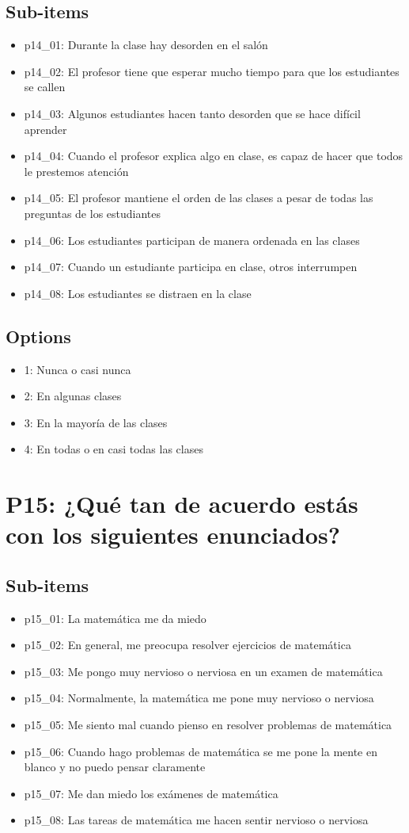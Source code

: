 \documentclass[11pt]{article}
\begin{document}
\subsection*{Sub-items}
\begin{itemize}[leftmargin=*]
  \item p14\_01: Durante la clase hay desorden en el salón
  \item p14\_02: El profesor tiene que esperar mucho tiempo para que los estudiantes se callen
  \item p14\_03: Algunos estudiantes hacen tanto desorden que se hace difícil aprender
  \item p14\_04: Cuando el profesor explica algo en clase, es capaz de hacer que todos le prestemos atención
  \item p14\_05: El profesor mantiene el orden de las clases a pesar de todas las preguntas de los estudiantes
  \item p14\_06: Los estudiantes participan de manera ordenada en las clases
  \item p14\_07: Cuando un estudiante participa en clase, otros interrumpen
  \item p14\_08: Los estudiantes se distraen en la clase
\end{itemize}
\subsection*{Options}
\begin{itemize}[leftmargin=*]
  \item 1: Nunca o casi nunca
  \item 2: En algunas clases
  \item 3: En la mayoría de las clases
  \item 4: En todas o en casi todas las clases
\end{itemize}
\bigskip
\section*{P15: ¿Qué tan de acuerdo estás con los siguientes enunciados?}
\subsection*{Sub-items}
\begin{itemize}[leftmargin=*]
  \item p15\_01: La matemática me da miedo
  \item p15\_02: En general, me preocupa resolver ejercicios de matemática
  \item p15\_03: Me pongo muy nervioso o nerviosa en un examen de matemática
  \item p15\_04: Normalmente, la matemática me pone muy nervioso o nerviosa
  \item p15\_05: Me siento mal cuando pienso en resolver problemas de matemática
  \item p15\_06: Cuando hago problemas de matemática se me pone la mente en blanco y no puedo pensar claramente
  \item p15\_07: Me dan miedo los exámenes de matemática
  \item p15\_08: Las tareas de matemática me hacen sentir nervioso o nerviosa
\end{itemize}
\end{document}

